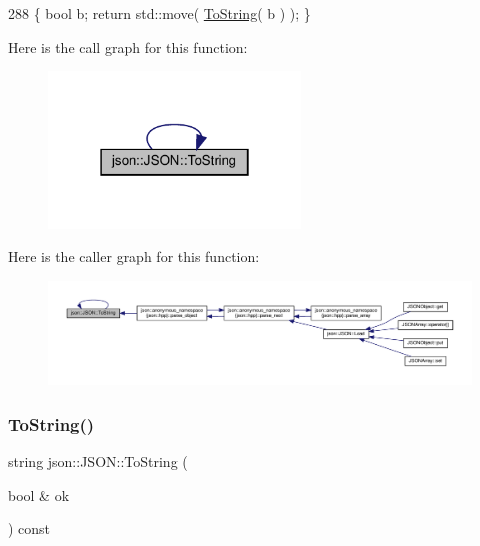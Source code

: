 \begin{DoxyCode}
288 \{ \textcolor{keywordtype}{bool} b; \textcolor{keywordflow}{return} std::move( \mbox{\hyperlink{classjson_1_1_j_s_o_n_a5f1c7695d59c4652f01cb087eff954f5}{ToString}}( b ) ); \}
\end{DoxyCode}
Here is the call graph for this function\+:
\nopagebreak
\begin{figure}[H]
\begin{center}
\leavevmode
\includegraphics[width=190pt]{classjson_1_1_j_s_o_n_a5f1c7695d59c4652f01cb087eff954f5_cgraph}
\end{center}
\end{figure}
Here is the caller graph for this function\+:
\nopagebreak
\begin{figure}[H]
\begin{center}
\leavevmode
\includegraphics[width=350pt]{classjson_1_1_j_s_o_n_a5f1c7695d59c4652f01cb087eff954f5_icgraph}
\end{center}
\end{figure}
\mbox{\label{classjson_1_1_j_s_o_n_a08f4e57ef30b5dc6881179017e2196d0}} 
\subsubsection{\texorpdfstring{To\+String()}{ToString()}\hspace{0.1cm}{\footnotesize\ttfamily [2/2]}}
{\footnotesize\ttfamily string json\+::\+J\+S\+O\+N\+::\+To\+String (\begin{DoxyParamCaption}\item[{bool \&}]{ok }\end{DoxyParamCaption}) const\hspace{0.3cm}{\ttfamily [inline]}}



